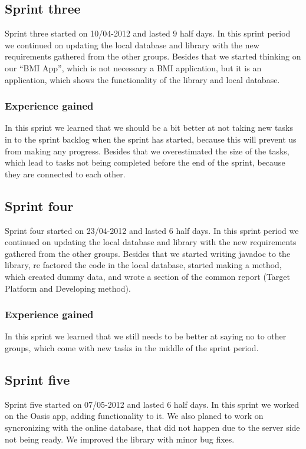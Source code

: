 \subsection{Sprint three}
Sprint three started on 10/04-2012 and lasted 9 half days. In this sprint period we continued on updating the local database and library with the new requirements gathered from the other groups. Besides that we started thinking on our "`BMI App"', which is not necessary a BMI application, but it is an application, which shows the functionality of the library and local database.

\subsubsection{Experience gained}
In this sprint we learned that we should be a bit better at not taking new tasks in to the sprint backlog when the sprint has started, because this will prevent us from making any progress. Besides that we overestimated the size of the tasks, which lead to tasks not being completed before the end of the sprint, because they are connected to each other.

\subsection{Sprint four}
Sprint four started on 23/04-2012 and lasted 6 half days. In this sprint period we continued on updating the local database and library with the new requirements gathered from the other groups. Besides that we started writing javadoc to the library, re factored the code in the local database, started making a method, which created dummy data, and wrote a section of the common report (Target Platform and Developing method).

\subsubsection{Experience gained}
In this sprint we learned that we still needs to be better at saying no to other groups, which come with new tasks in the middle of the sprint period.

\subsection{Sprint five}
Sprint five started on 07/05-2012 and lasted 6 half days. In this sprint we worked on the Oasis app, adding functionality to it. We also planed to work on syncronizing with the online database, that did not happen due to the server side not being ready. We improved the library with minor bug fixes.

